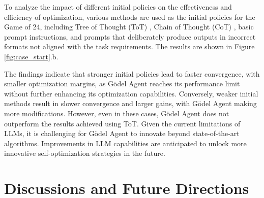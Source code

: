 \documentclass[11pt]{article}
\newcommand{\framework}{Gödel Agent\xspace}
\begin{document}
To analyze the impact of different initial policies on the effectiveness and efficiency of optimization, various methods are used as the initial policies for the Game of 24, including Tree of Thought (ToT) \citep{yao2023treethoughtsdeliberateproblem}, Chain of Thought (CoT) \citep{wei2022chain}, basic prompt instructions, and prompts that deliberately produce outputs in incorrect formats not aligned with the task requirements. The results are shown in Figure \ref{fig:case_start}.b.

The findings indicate that stronger initial policies lead to faster convergence, with smaller optimization margins, as \framework reaches its performance limit without further enhancing its optimization capabilities. Conversely, weaker initial methods result in slower convergence and larger gains, with \framework making more modifications. However, even in these cases, \framework does not outperform the results achieved using ToT. Given the current limitations of LLMs, it is challenging for \framework to innovate beyond state-of-the-art algorithms. Improvements in LLM capabilities are anticipated to unlock more innovative self-optimization strategies in the future.



\section{Discussions and Future Directions}

\label{sec:future}
\label{app:future}
\end{document}
